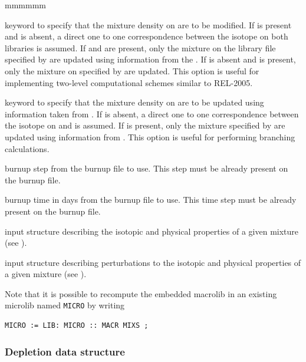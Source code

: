 \begin{ListeDeDescription}{mmmmmm}
\item[\moc{MAXS}] keyword to specify that the mixture density on 
are to be modified. If  is present and  is absent, a
direct one to one correspondence between the isotope on both libraries is
assumed. If  and  are present, only the
mixture on the library file specified by  are updated using
information from the . If  is absent and
 is present, only the mixture on   specified by
 are updated. This option is useful for implementing two-level
computational schemes similar to REL-2005.

\item[\moc{BURN}] keyword to specify that the mixture density on 
are to be updated using information taken from . If 
is absent, a direct one to one correspondence between the isotope on
 and   is assumed. If   is present, only
the mixture specified by  are updated using information from
. This option is useful for performing branching calculations.

\item[\dusa{iburn}] burnup step from the burnup file to use. This step must be
already present on the burnup file.

\item[\dusa{tburn}] burnup time in days from the burnup file to use. This time
step must be already present on the burnup file.

\item[\dstr{descmix1}] input structure describing the
isotopic and physical properties of a given mixture (see ).

\item[\dstr{descmix2}] input structure describing perturbations to the
isotopic and physical properties of a given mixture (see ).


\end{ListeDeDescription}

Note that it is possible to recompute the embedded macrolib in an existing microlib
named {\tt MICRO} by writing
\begin{verbatim}
MICRO := LIB: MICRO :: MACR MIXS ;
\end{verbatim}

\subsubsection{Depletion data structure}\label{sect:descdepl}

